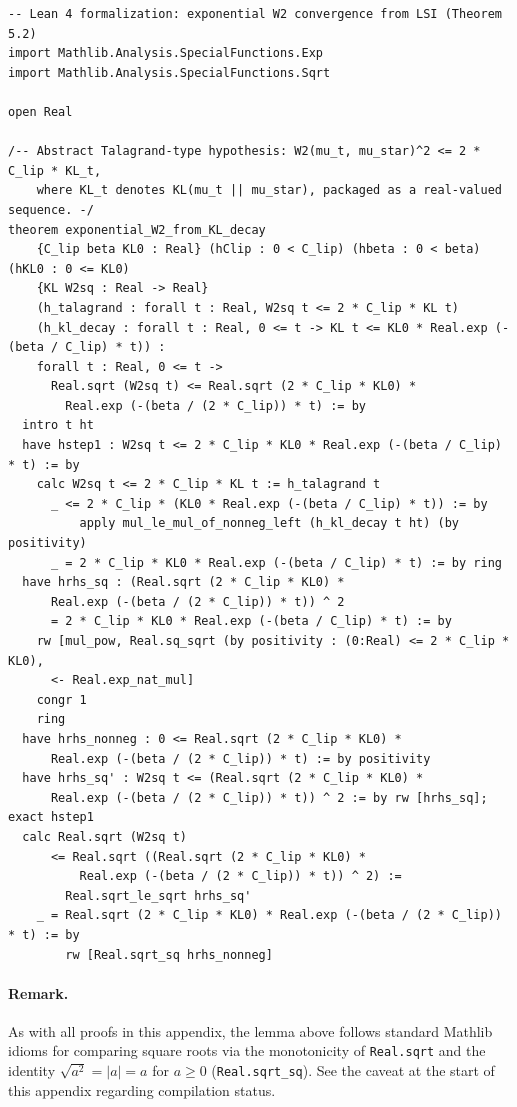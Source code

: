 \begin{lstlisting}[style=lean4, caption={Exponential decay of $W_2$ from exponential decay of KL divergence, via Talagrand's inequality.}]
-- Lean 4 formalization: exponential W2 convergence from LSI (Theorem 5.2)
import Mathlib.Analysis.SpecialFunctions.Exp
import Mathlib.Analysis.SpecialFunctions.Sqrt

open Real

/-- Abstract Talagrand-type hypothesis: W2(mu_t, mu_star)^2 <= 2 * C_lip * KL_t,
    where KL_t denotes KL(mu_t || mu_star), packaged as a real-valued sequence. -/
theorem exponential_W2_from_KL_decay
    {C_lip beta KL0 : Real} (hClip : 0 < C_lip) (hbeta : 0 < beta) (hKL0 : 0 <= KL0)
    {KL W2sq : Real -> Real}
    (h_talagrand : forall t : Real, W2sq t <= 2 * C_lip * KL t)
    (h_kl_decay : forall t : Real, 0 <= t -> KL t <= KL0 * Real.exp (-(beta / C_lip) * t)) :
    forall t : Real, 0 <= t ->
      Real.sqrt (W2sq t) <= Real.sqrt (2 * C_lip * KL0) *
        Real.exp (-(beta / (2 * C_lip)) * t) := by
  intro t ht
  have hstep1 : W2sq t <= 2 * C_lip * KL0 * Real.exp (-(beta / C_lip) * t) := by
    calc W2sq t <= 2 * C_lip * KL t := h_talagrand t
      _ <= 2 * C_lip * (KL0 * Real.exp (-(beta / C_lip) * t)) := by
          apply mul_le_mul_of_nonneg_left (h_kl_decay t ht) (by positivity)
      _ = 2 * C_lip * KL0 * Real.exp (-(beta / C_lip) * t) := by ring
  have hrhs_sq : (Real.sqrt (2 * C_lip * KL0) *
      Real.exp (-(beta / (2 * C_lip)) * t)) ^ 2
      = 2 * C_lip * KL0 * Real.exp (-(beta / C_lip) * t) := by
    rw [mul_pow, Real.sq_sqrt (by positivity : (0:Real) <= 2 * C_lip * KL0),
      <- Real.exp_nat_mul]
    congr 1
    ring
  have hrhs_nonneg : 0 <= Real.sqrt (2 * C_lip * KL0) *
      Real.exp (-(beta / (2 * C_lip)) * t) := by positivity
  have hrhs_sq' : W2sq t <= (Real.sqrt (2 * C_lip * KL0) *
      Real.exp (-(beta / (2 * C_lip)) * t)) ^ 2 := by rw [hrhs_sq]; exact hstep1
  calc Real.sqrt (W2sq t)
      <= Real.sqrt ((Real.sqrt (2 * C_lip * KL0) *
          Real.exp (-(beta / (2 * C_lip)) * t)) ^ 2) :=
        Real.sqrt_le_sqrt hrhs_sq'
    _ = Real.sqrt (2 * C_lip * KL0) * Real.exp (-(beta / (2 * C_lip)) * t) := by
        rw [Real.sqrt_sq hrhs_nonneg]
\end{lstlisting}

\paragraph{Remark.} As with all proofs in this appendix, the lemma above follows
standard Mathlib idioms for comparing square roots via the monotonicity of
\texttt{Real.sqrt} and the identity $\sqrt{a^2} = |a| = a$ for $a \ge 0$
(\texttt{Real.sqrt\_sq}). See the caveat at the start of this appendix regarding
compilation status.
